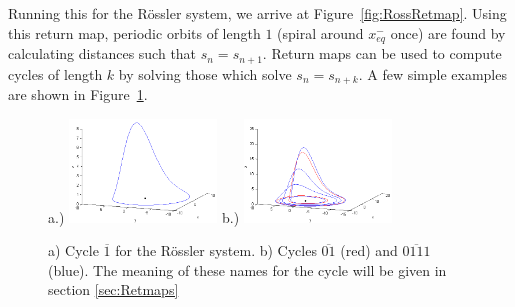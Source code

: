 \documentclass[12 pt]{article}
\begin{document}
Running this for the R\"ossler system, we arrive at
Figure~\ref{fig:RossRetmap}.  Using this return map, periodic orbits of
length $1$ (spiral around $x_{eq}^{-}$ once) are found by calculating
distances such that $s_n = s_{n+1}$.  Return maps can be used to compute
cycles of length $k$ by solving those which solve $s_n = s_{n+k}$.  A few
simple examples are shown in Figure~\ref{fig:RossPO}.

\begin{figure}[h]
\centering
a.)  \includegraphics[width=0.35\textwidth]{Figs/Section1/kcross1cyclec.png}
b.)
  \includegraphics[width=0.35\textwidth]{Figs/Section1/kcross24cyclesc.png}
\caption{
a) Cycle $\overline{1}$ for the R\"ossler system.
b) Cycles $\overline{01}$ (red) and $\overline{0111}$ (blue).  The
meaning of these names for the cycle will be given in section
\ref{sec:Retmaps}}
 \label{fig:RossPO}
\end{figure}
\end{document}
